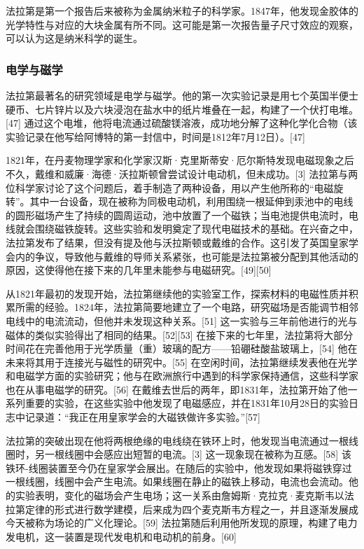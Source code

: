 法拉第是第一个报告后来被称为金属纳米粒子的科学家。1847年，他发现金胶体的光学特性与对应的大块金属有所不同。这可能是第一次报告量子尺寸效应的观察，可以认为这是纳米科学的诞生。
\subsubsection{电学与磁学}  
法拉第最著名的研究领域是电学与磁学。他的第一次实验记录是用七个英国半便士硬币、七片锌片以及六块浸泡在盐水中的纸片堆叠在一起，构建了一个伏打电堆。[47] 通过这个电堆，他将电流通过硫酸镁溶液，成功地分解了这种化学化合物（该实验记录在他写给阿博特的第一封信中，时间是1812年7月12日）。[47]

1821年，在丹麦物理学家和化学家汉斯·克里斯蒂安·厄尔斯特发现电磁现象之后不久，戴维和威廉·海德·沃拉斯顿曾尝试设计电动机，但未成功。[3] 法拉第与两位科学家讨论了这个问题后，着手制造了两种设备，用以产生他所称的“电磁旋转”。其中一台设备，现在被称为同极电动机，利用围绕一根延伸到汞池中的电线的圆形磁场产生了持续的圆周运动，池中放置了一个磁铁；当电池提供电流时，电线就会围绕磁铁旋转。这些实验和发明奠定了现代电磁技术的基础。在兴奋之中，法拉第发布了结果，但没有提及他与沃拉斯顿或戴维的合作。这引发了英国皇家学会内的争议，导致他与戴维的导师关系紧张，也可能是法拉第被分配到其他活动的原因，这使得他在接下来的几年里未能参与电磁研究。[49][50]

从1821年最初的发现开始，法拉第继续他的实验室工作，探索材料的电磁性质并积累所需的经验。1824年，法拉第简要地建立了一个电路，研究磁场是否能调节相邻电线中的电流流动，但他并未发现这种关系。[51] 这一实验与三年前他进行的光与磁体的类似实验得出了相同的结果。[52][53] 在接下来的七年里，法拉第将大部分时间花在完善他用于光学质量（重）玻璃的配方——铅硼硅酸盐玻璃上，[54] 他在未来将其用于连接光与磁性的研究中。[55] 在空闲时间，法拉第继续发表他在光学和电磁学方面的实验研究；他与在欧洲旅行中遇到的科学家保持通信，这些科学家也在从事电磁学的研究。[56] 在戴维去世后的两年，即1831年，法拉第开始了他一系列重要的实验，在这些实验中他发现了电磁感应，并在1831年10月28日的实验日志中记录道：“我正在用皇家学会的大磁铁做许多实验。”[57]

法拉第的突破出现在他将两根绝缘的电线绕在铁环上时，他发现当电流通过一根线圈时，另一根线圈中会感应出短暂的电流。[3] 这一现象现在被称为互感。[58] 该铁环-线圈装置至今仍在皇家学会展出。在随后的实验中，他发现如果将磁铁穿过一根线圈，线圈中会产生电流。如果线圈在静止的磁铁上移动，电流也会流动。他的实验表明，变化的磁场会产生电场；这一关系由詹姆斯·克拉克·麦克斯韦以法拉第定律的形式进行数学建模，后来成为四个麦克斯韦方程之一，并且逐渐发展成今天被称为场论的广义化理论。[59] 法拉第随后利用他所发现的原理，构建了电力发电机，这一装置是现代发电机和电动机的前身。[60]

